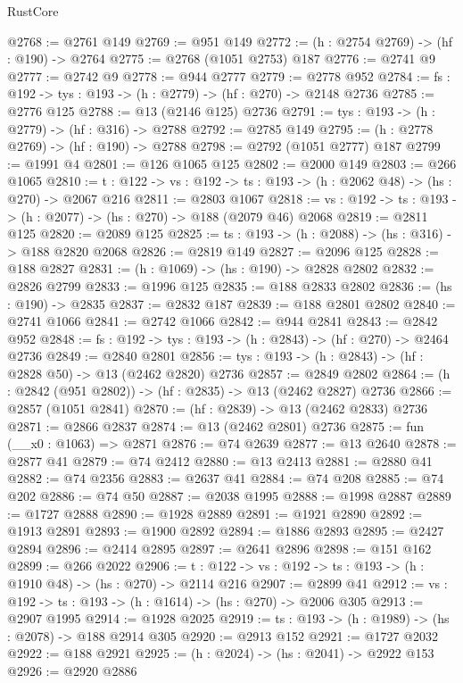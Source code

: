 \begin{lexlean}{RustCore}
\begin{coremodule}
@2768 := @2761 @149
@2769 := @951 @149
@2772 := (h : @2754 @2769) -> (hf : @190) -> @2764
@2775 := @2768 (@1051 @2753) @187
@2776 := @2741 @9
@2777 := @2742 @9
@2778 := @944 @2777
@2779 := @2778 @952
@2784 := {fs : @192} -> {tys : @193} -> (h : @2779) -> (hf : @270) -> @2148 @2736
@2785 := @2776 @125
@2788 := @13 (@2146 @125) @2736
@2791 := {tys : @193} -> (h : @2779) -> (hf : @316) -> @2788
@2792 := @2785 @149
@2795 := (h : @2778 @2769) -> (hf : @190) -> @2788
@2798 := @2792 (@1051 @2777) @187
@2799 := @1991 @4
@2801 := @126 @1065 @125
@2802 := @2000 @149
@2803 := @266 @1065
@2810 := {t : @122} -> {vs : @192} -> {ts : @193} -> (h : @2062 @48) -> (hs : @270) -> @2067 @216
@2811 := @2803 @1067
@2818 := {vs : @192} -> {ts : @193} -> (h : @2077) -> (hs : @270) -> @188 (@2079 @46) @2068
@2819 := @2811 @125
@2820 := @2089 @125
@2825 := {ts : @193} -> (h : @2088) -> (hs : @316) -> @188 @2820 @2068
@2826 := @2819 @149
@2827 := @2096 @125
@2828 := @188 @2827
@2831 := (h : @1069) -> (hs : @190) -> @2828 @2802
@2832 := @2826 @2799
@2833 := @1996 @125
@2835 := @188 @2833 @2802
@2836 := (hs : @190) -> @2835
@2837 := @2832 @187
@2839 := @188 @2801 @2802
@2840 := @2741 @1066
@2841 := @2742 @1066
@2842 := @944 @2841
@2843 := @2842 @952
@2848 := {fs : @192} -> {tys : @193} -> (h : @2843) -> (hf : @270) -> @2464 @2736
@2849 := @2840 @2801
@2856 := {tys : @193} -> (h : @2843) -> (hf : @2828 @50) -> @13 (@2462 @2820) @2736
@2857 := @2849 @2802
@2864 := (h : @2842 (@951 @2802)) -> (hf : @2835) -> @13 (@2462 @2827) @2736
@2866 := @2857 (@1051 @2841)
@2870 := (hf : @2839) -> @13 (@2462 @2833) @2736
@2871 := @2866 @2837
@2874 := @13 (@2462 @2801) @2736
@2875 := fun (__x0 : @1063) => @2871
@2876 := @74 @2639
@2877 := @13 @2640
@2878 := @2877 @41
@2879 := @74 @2412
@2880 := @13 @2413
@2881 := @2880 @41
@2882 := @74 @2356
@2883 := @2637 @41
@2884 := @74 @208
@2885 := @74 @202
@2886 := @74 @50
@2887 := @2038 @1995
@2888 := @1998 @2887
@2889 := @1727 @2888
@2890 := @1928 @2889
@2891 := @1921 @2890
@2892 := @1913 @2891
@2893 := @1900 @2892
@2894 := @1886 @2893
@2895 := @2427 @2894
@2896 := @2414 @2895
@2897 := @2641 @2896
@2898 := @151 @162
@2899 := @266 @2022
@2906 := {t : @122} -> {vs : @192} -> {ts : @193} -> (h : @1910 @48) -> (hs : @270) -> @2114 @216
@2907 := @2899 @41
@2912 := {vs : @192} -> {ts : @193} -> (h : @1614) -> (hs : @270) -> @2006 @305
@2913 := @2907 @1995
@2914 := @1928 @2025
@2919 := {ts : @193} -> (h : @1989) -> (hs : @2078) -> @188 @2914 @305
@2920 := @2913 @152
@2921 := @1727 @2032
@2922 := @188 @2921
@2925 := (h : @2024) -> (hs : @2041) -> @2922 @153
@2926 := @2920 @2886

\end{coremodule}
\end{lexlean}

